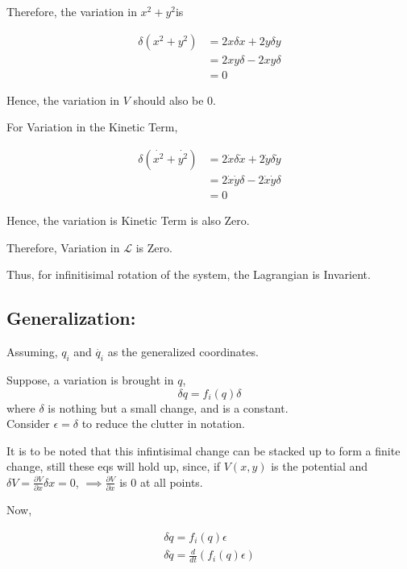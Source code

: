 \documentclass[a4paper]{article}
\newcommand{\Lagr}{\mathcal{L}}
\newcommand{\ddt}{\frac{d}{dt}}
\newcommand{\pdt}[2]{\frac{\partial #1}{\partial #2}}
\begin{document}
			Therefore, the variation in $x^2 + y^2$is
			
			\begin{equation}
				\begin{split}	
					\delta (x^2 + y^2) & = 2 x \delta x + 2y \delta y \\
					&= 2 x y \delta - 2 x y \delta  \\
					& = 0
				\end{split}
			\end{equation}
			
			Hence, the variation in $V$ should also be $0$.

			For Variation in the Kinetic Term,

			\begin{equation}
				\begin{split}	
					\delta (\dot{x^2} + \dot{y^2}) & = 2 \dot{x} \delta \dot{x} + 2 \dot{y} \delta \dot{y} \\
					& = 2 \dot{x} \dot{y} \delta - 2 \dot{x} \dot{y} \delta \\
					& = 0
				\end{split}
			\end{equation}
			
			Hence, the variation is Kinetic Term is also Zero.

			Therefore, Variation in $\Lagr$ is Zero.

			Thus, for infinitisimal rotation of the system, the Lagrangian is Invarient.
			
		\subsection*{Generalization: }

			\noindent

			Assuming, $q_i$ and $\dot{q_i}$ as the generalized coordinates.

			Suppose, a variation is brought in $q$,
			$$ \delta q = f_i(q) \delta $$ where $\delta$ is nothing but a small change, and is a constant. \hfill \\
			Consider $\epsilon = \delta$ to reduce the clutter in notation.

			It is to be noted that this infintisimal change can be stacked up to form a finite change, still these eqs will hold up, since, if $V(x, y)$ is the potential and $\delta V = \pdt{V}{x}\delta x = 0$, $\implies \pdt{V}{x}$ is $0$ at all points.

			Now,

			\begin{eqnarray}
				\delta q = f_i(q) \epsilon \label{eq_q} \\
				\delta \dot{q} = \ddt(f_i(q) \epsilon) \label{eq_dotq}
			\end{eqnarray}
			
\end{document}
